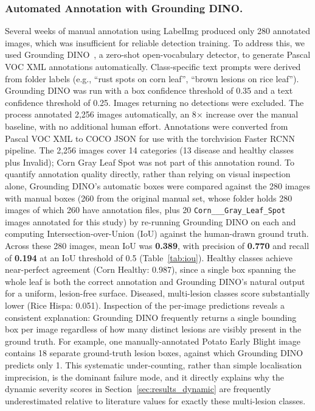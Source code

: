 \subsubsection{Automated Annotation with Grounding DINO.}
Several weeks of manual annotation using LabelImg produced only 280
annotated images, which was insufficient for reliable detection training.
To address this, we used Grounding DINO~\cite{groundingdino}, a
zero-shot open-vocabulary detector, to generate Pascal VOC XML
annotations automatically.
Class-specific text prompts were derived from folder labels
(e.g., ``rust spots on corn leaf'', ``brown lesions on rice leaf'').
Grounding DINO was run with a box confidence threshold of 0.35 and
a text confidence threshold of 0.25.
Images returning no detections were excluded.
The process annotated 2,256 images automatically, an 8$\times$
increase over the manual baseline, with no additional human effort.
Annotations were converted from Pascal VOC XML to COCO JSON for use
with the torchvision Faster RCNN pipeline. The 2,256 images cover 14
categories (13 disease and healthy classes plus Invalid); Corn Gray Leaf
Spot was not part of this annotation round.
To quantify annotation quality directly, rather than relying on
visual inspection alone, Grounding DINO's automatic boxes were
compared against the 280 images with manual boxes (260 from the original
manual set, whose folder holds 280 images of which 260 have annotation
files, plus 20 \texttt{Corn\_\_\_Gray\_Leaf\_Spot} images annotated for
this study) by re-running Grounding DINO on each and computing
Intersection-over-Union (IoU) against the human-drawn ground truth.
Across these 280 images,
mean IoU was \textbf{0.389}, with precision of \textbf{0.770} and
recall of \textbf{0.194} at an IoU threshold of 0.5
(Table~\ref{tab:iou}). Healthy classes achieve near-perfect agreement
(Corn Healthy: 0.987), since a single box spanning the whole leaf is
both the correct annotation and Grounding DINO's natural output for a
uniform, lesion-free surface. Diseased, multi-lesion classes score
substantially lower (Rice Hispa: 0.051). Inspection of the per-image
predictions reveals a consistent explanation: Grounding DINO
frequently returns a single bounding box per image regardless of how
many distinct lesions are visibly present in the ground truth. For
example, one manually-annotated Potato Early Blight image contains 18
separate ground-truth lesion boxes, against which Grounding DINO
predicts only 1. This systematic under-counting, rather than simple
localisation imprecision, is the dominant failure mode, and it
directly explains why the dynamic severity scores in
Section~\ref{sec:results_dynamic} are frequently underestimated
relative to literature values for exactly these multi-lesion classes.

